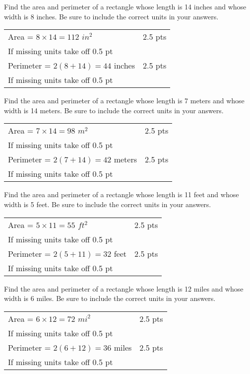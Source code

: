 {
	Find the area and perimeter of a rectangle whose length is 14 inches and whose width is 8 inches. Be sure to include the correct units in your answers.
}
{
	\begin{tabular}{l r}
	Area = $8 \times 14 = 112$ $in^{2}$ & 2.5 pts \\  
	If missing units take off 0.5 pt\\
	Perimeter = $2(8 + 14)=44$ inches  & 2.5 pts \\ 
	If missing units take off 0.5 pt\\
	\end{tabular}
}

{
	Find the area and perimeter of a rectangle whose length is 7 meters and whose width is 14 meters. Be sure to include the correct units in your answers.
}
{
	\begin{tabular}{l r}
	Area = $7 \times 14 = 98$ $m^{2}$ & 2.5 pts\\ 
	If missing units take off 0.5 pt\\
	Perimeter = $2(7+14)=42$ meters  & 2.5 pts\\
	If missing units take off 0.5 pt\\
	\end{tabular}
}

{
	Find the area and perimeter of a rectangle whose length is 11 feet and whose width is 5 feet. Be sure to include the correct units in your answers.
}
{
	\begin{tabular}{l r}
	Area = $5 \times 11 = 55$ $ft^{2}$ & 2.5 pts \\
	If missing units take off 0.5 pt\\
	Perimeter = $2(5+11)=32$ feet  & 2.5 pts\\
	If missing units take off 0.5 pt\\
	\end{tabular}
}

{
	Find the area and perimeter of a rectangle whose length is 12 miles and whose width is 6 miles. Be sure to include the correct units in your answers.
}
{
	\begin{tabular}{l r}
	Area = $6 \times 12 = 72$ $mi^{2}$ & 2.5 pts \\
	If missing units take off 0.5 pt\\
	Perimeter = $2(6+12)=36$ miles  & 2.5 pts \\
	If missing units take off 0.5 pt\\
	\end{tabular}
}

